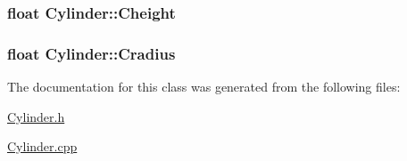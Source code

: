 \subsubsection[{\texorpdfstring{Cheight}{Cheight}}]{\setlength{\rightskip}{0pt plus 5cm}float Cylinder\+::\+Cheight\hspace{0.3cm}{\ttfamily [private]}}\hypertarget{classCylinder_a23c7f930120143398ea5c6a7d4f9baca}{}\label{classCylinder_a23c7f930120143398ea5c6a7d4f9baca}
\subsubsection[{\texorpdfstring{Cradius}{Cradius}}]{\setlength{\rightskip}{0pt plus 5cm}float Cylinder\+::\+Cradius\hspace{0.3cm}{\ttfamily [private]}}\hypertarget{classCylinder_a96b3a0758ef062f251f32073a3f701d8}{}\label{classCylinder_a96b3a0758ef062f251f32073a3f701d8}


The documentation for this class was generated from the following files\+:\begin{DoxyCompactItemize}
\item 
\hyperlink{Cylinder_8h}{Cylinder.\+h}\item 
\hyperlink{Cylinder_8cpp}{Cylinder.\+cpp}\end{DoxyCompactItemize}
